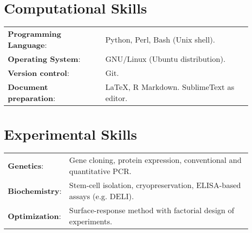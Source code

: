\documentclass[margin,line]{res}
\begin{document}
\begin{resume}
\section{\sc Computational Skills}
\begin{tabular}{ l l}
	{\bf Programming Language}: & Python, Perl, Bash (Unix shell).\\
	{\bf Operating System}: & GNU/Linux (Ubuntu distribution).\\ %
	{\bf Version control}: & Git.\\ %
	{\bf Document preparation}: & \LaTeX, R Markdown. SublimeText as editor.%
\end{tabular}

\section{\sc Experimental Skills}
\begin{tabular}{ l l }
	{\bf Genetics}: & Gene cloning, protein expression, conventional and quantitative PCR.\\
	{\bf Biochemistry}: & Stem-cell isolation, cryopreservation, ELISA-based assays (e.g. DELI).\\ 
	{\bf Optimization}: & Surface-response method with factorial design of experiments.\\
\end{tabular}


\end{resume}
\end{document}
